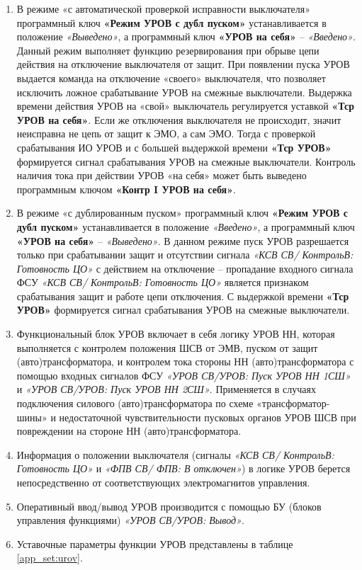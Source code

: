 \begin{enumerate}
\item
В режиме «с автоматической проверкой исправности выключателя» программный ключ
\textbf{«Режим УРОВ с дубл пуском»} устанавливается в положение \textit{«Выведено»}, а программный ключ \textbf{«УРОВ на
себя»} -- \textit{«Введено»}. Данный режим выполняет функцию резервирования при обрыве цепи действия на
отключение выключателя от защит. При появлении пуска УРОВ выдается команда на отключение «своего»
выключателя, что позволяет исключить ложное срабатывание УРОВ на смежные выключатели. Выдержка
времени действия УРОВ на «свой» выключатель регулируется уставкой \textbf{«Тср УРОВ на себя»}. Если же
отключения выключателя не происходит, значит неисправна не цепь от защит к ЭМО, а сам ЭМО. Тогда с
проверкой срабатывания ИО УРОВ и с большей выдержкой времени \textbf{«Тср УРОВ»} формируется сигнал
срабатывания УРОВ на смежные выключатели. Контроль наличия тока при действии УРОВ «на себя» может
быть выведено программным ключом \textbf{«Контр I УРОВ на себя»}.

\item
В режиме «с дублированным пуском» программный ключ \textbf{«Режим УРОВ с дубл пуском»} устанавливается в положение
\textit{«Введено»}, а программный ключ \textbf{«УРОВ на себя»} – \textit{«Выведено»}. В данном режиме пуск УРОВ разрешается
только при срабатывании защит и отсутствии сигнала \textit{«КСВ СВ/ КонтрольВ: Готовность ЦО»} с действием на отключение --
пропадание входного сигнала ФСУ \textit{«КСВ СВ/ КонтрольВ: Готовность ЦО»} является признаком срабатывания защит и работе цепи
отключения. С выдержкой времени \textbf{«Тср УРОВ»} формируется сигнал срабатывания УРОВ на смежные
выключатели.

\item
Функциональный блок УРОВ включает в себя логику УРОВ НН, которая выполняется с контролем
положения ШСВ от ЭМВ, пуском от защит (авто)трансформатора, и контролем тока стороны НН
(авто)трансформатора с помощью входных сигналов ФСУ \textit{«УРОВ СВ/УРОВ: Пуск УРОВ НН 1СШ»} и \textit{«УРОВ СВ/УРОВ: Пуск УРОВ НН 2СШ»}.
Применяется в случаях подключения силового (авто)трансформатора по схеме «трансформатор-шины» и
недостаточной чувствительности пусковых органов УРОВ ШСВ при повреждении на стороне НН
(авто)трансформатора. 

\item
Информация о положении выключателя (сигналы \textit{«КСВ СВ/ КонтрольВ: Готовность ЦО»} и \textit{«ФПВ СВ/ ФПВ: В отключен»}) в логике УРОВ
берется непосредственно от соответствующих электромагнитов управления.

\item
Оперативный ввод/вывод УРОВ производится с помощью БУ (блоков управления функциями) \textit{«УРОВ СВ/УРОВ: Вывод»}. 

\item
Уставочные параметры функции УРОВ представлены в таблице \ref{app_set:urov}.

\end{enumerate}